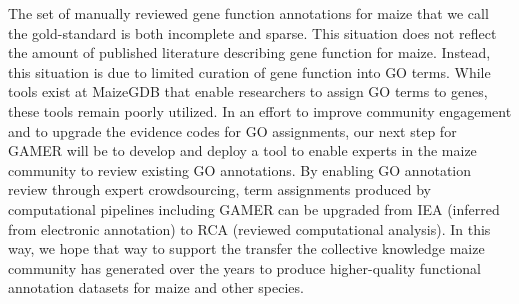 The set of manually reviewed gene function annotations for maize that we call the gold-standard is both incomplete and sparse. This situation does not reflect the amount of published literature describing gene function for maize. Instead, this situation is due to limited curation of gene function into GO terms. While tools exist at MaizeGDB that enable researchers to assign GO terms to genes, these tools remain poorly utilized.  In an effort to improve community engagement and to upgrade the evidence codes for GO assignments, our next step for GAMER will be to develop and deploy a tool to enable experts in the maize community to review existing GO annotations. By enabling GO annotation review through expert crowdsourcing, term assignments produced by computational pipelines including GAMER can be upgraded from IEA (inferred from electronic annotation) to RCA (reviewed computational analysis). In this way, we hope that way to support the transfer the collective knowledge maize community has generated over the years to produce higher-quality functional annotation datasets for maize and other species. 



